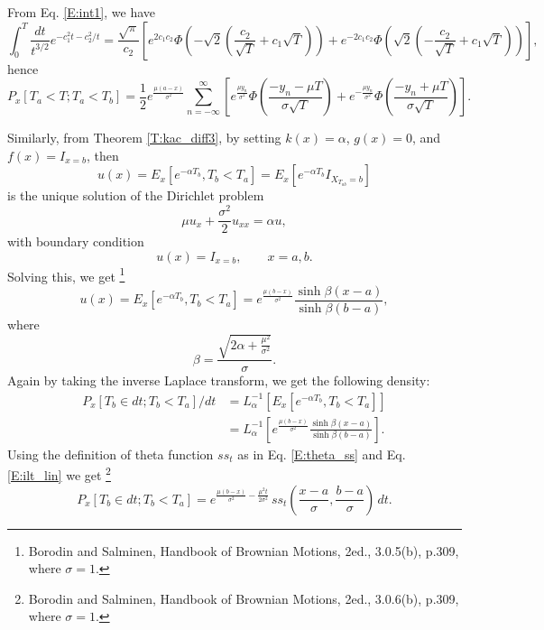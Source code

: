 From Eq. \ref{E:int1}, we have
\[
  \int_0^T \frac{dt}{t^{3/2}} e^{-c_1^2 t - c_2^2/t}
    = \frac{\sqrt{\pi}}{c_2} 
      \left[
        e^{2c_1c_2} \Phi\left( -\sqrt{2} (\frac{c_2}{\sqrt{T}} + c_1\sqrt{T}) \right)
      + e^{-2c_1c_2} \Phi\left( \sqrt{2} (-\frac{c_2}{\sqrt{T}} + c_1\sqrt{T}) \right)
      \right],
\]
hence
\begin{equation}
  P_x[T_a<T; T_a<T_b]  
    = \frac{1}{2} e^{\frac{\mu (a-x)}{\sigma^2}} 
      \sum_{n=-\infty}^{\infty}
      \left[
        e^{\frac{\mu y_n}{\sigma^2}} 
          \Phi\left( \frac{-y_n - \mu T}{\sigma \sqrt{T}} \right)
      + e^{-\frac{\mu y_n}{\sigma^2}} 
          \Phi\left( \frac{-y_n + \mu T}{\sigma \sqrt{T}} \right)
      \right].
\end{equation}



Similarly, from Theorem \ref{T:kac_diff3}, by setting $k(x)=\alpha$, $g(x)=0$, 
and $f(x)=I_{x=b}$, then 
\[
	u(x) = E_x[e^{-\alpha T_b}, T_b<T_a] 
	= E_x[e^{-\alpha T_b} I_{X_{T_{ab}}=b}]
\]
is the unique solution of the Dirichlet problem
\[
	 \mu u_{x} + \frac{\sigma^2}{2} u_{xx} = \alpha u,
\]
with boundary condition
\[
	u(x)= I_{x=b}, \qquad x=a,b.
\]
Solving this, we get
\footnote{Borodin and Salminen, Handbook of Brownian Motions, 2ed., 3.0.5(b),
  p.309, where $\sigma=1$.}
\begin{equation}
	u(x) = E_x[e^{-\alpha T_b}, T_b<T_a] 
	     = e^{\frac{\mu (b-x)}{\sigma^2} } 
	       \frac{\sinh \beta (x-a)}{\sinh \beta(b-a)},
\end{equation}
where 
\[
	\beta = \frac{\sqrt{2\alpha+\frac{\mu^2}{\sigma^2}}}{\sigma}.
\]
Again by taking the inverse Laplace transform, we get the following density:
\begin{align*}
	P_x[T_b\in dt; T_b<T_a]/dt 
	&= L_{\alpha}^{-1} \left[  E_x[e^{-\alpha T_b}, T_b<T_a] \right] \\
	&= L_{\alpha}^{-1} 
	   \left[ 
		  e^{\frac{\mu (b-x)}{\sigma^2} } \frac{\sinh \beta (x-a)}{\sinh \beta(b-a)}
     \right]. 
\end{align*}
Using the definition of theta function $ss_t$ as in Eq. \ref{E:theta_ss} and Eq.
\ref{E:ilt_lin} we get
\footnote{Borodin and Salminen, Handbook of Brownian Motions, 2ed., 3.0.6(b),
  p.309, where $\sigma=1$.}
\begin{equation}
	P_x[T_b\in dt; T_b<T_a]  
	= e^{\frac{\mu (b-x)}{\sigma^2} - \frac{\mu^2 t}{2\sigma^2}}  \,
	  ss_t \left( \frac{x-a}{\sigma}, \frac{b-a}{\sigma} \right) \, dt.
\end{equation}

